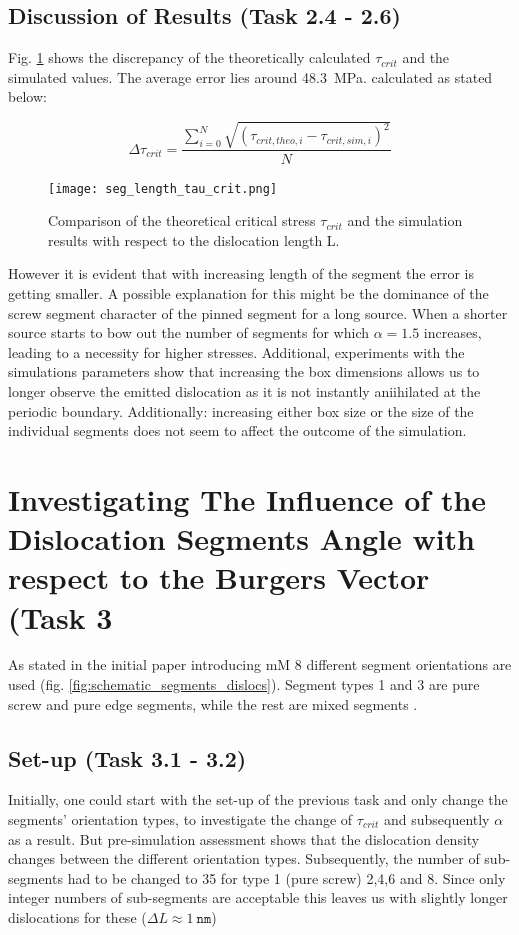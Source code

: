 \subsection{Discussion of Results (Task 2.4 - 2.6)}
Fig. \ref{fig:tau_crit_theo_vs_sim} shows the discrepancy of the theoretically calculated \(\tau_{crit}\) and the simulated values. The average error lies around 48.3~MPa. calculated as stated below:

\begin{equation}
	\Delta \tau_{crit} = \frac{\sum_{i=0}^{N} \sqrt{(\tau_{crit,theo,i} - \tau_{crit,sim,i})^{2}}}{N} 
\end{equation}

\begin{figure}[htb]
	\centering
	\texttt{[image: seg\_length\_tau\_crit.png]}
	\caption{Comparison of the theoretical critical stress \(\tau_{crit}\) and the simulation results with respect to the dislocation length L.}
	\label{fig:tau_crit_theo_vs_sim}
\end{figure}

However it is evident that with increasing length of the segment the error is getting smaller. A possible explanation for this might be the dominance of the screw segment character of the pinned segment for a long source. When a shorter source starts to bow out the number of segments for which \(\alpha = 1.5\) increases, leading to a necessity for higher stresses. Additional, experiments with the simulations parameters show that increasing the box dimensions allows us to longer observe the emitted dislocation as it is not instantly aniihilated at the periodic boundary. Additionally: increasing either box size or the size of the individual segments does not seem to affect the outcome of the simulation.

\section{Investigating The Influence of the Dislocation Segments Angle with respect to the Burgers Vector (Task 3}

As stated in the initial paper introducing mM 8 different segment orientations are used (fig. \ref{fig:schematic_segments_dislocs}). Segment types 1 and 3 are pure screw and pure edge segments, while the rest are mixed segments \cite{devincre2011}.

\subsection{Set-up (Task 3.1 - 3.2)}
Initially, one could start with the set-up of the previous task and only change the segments' orientation types, to investigate the change of \(\tau_{crit}\) and subsequently \(\alpha\) as a result.
But pre-simulation assessment shows that the dislocation density changes between the different orientation types. Subsequently, the number of sub-segments had to be changed to 35 for type 1 (pure screw) 2,4,6 and 8. Since only integer numbers of sub-segments are acceptable this leaves us with slightly longer dislocations for these (\( \Delta L \approx 1~\mathtt{nm}\))  

